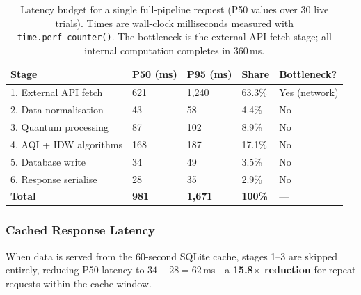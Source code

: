 \documentclass[12pt,a4paper]{article}
\begin{document}
\begin{table}[H]
\centering
\caption[End-to-end latency decomposition]{%
Latency budget for a single full-pipeline request (P50 values over 30
live trials). Times are wall-clock milliseconds measured with
\texttt{time.perf\_counter()}. The bottleneck is the external API fetch
stage; all internal computation completes in 360\,ms.}
\label{tab:latency}
\begin{tabularx}{\textwidth}{@{}lXXXX@{}}
\toprule
\textbf{Stage} & \textbf{P50 (ms)} & \textbf{P95 (ms)}
               & \textbf{Share} & \textbf{Bottleneck?} \\
\midrule
1. External API fetch   & 621 & 1,240 & 63.3\% & Yes (network) \\
2. Data normalisation   &  43 &    58 &  4.4\% & No \\
3. Quantum processing   &  87 &   102 &  8.9\% & No \\
4. AQI + IDW algorithms & 168 &   187 & 17.1\% & No \\
5. Database write       &  34 &    49 &  3.5\% & No \\
6. Response serialise   &  28 &    35 &  2.9\% & No \\
\midrule
\textbf{Total}          & \textbf{981} & \textbf{1,671}
                        & \textbf{100\%} & --- \\
\bottomrule
\end{tabularx}
\end{table}

\subsubsection{Cached Response Latency}

When data is served from the 60-second SQLite cache, stages 1--3 are
skipped entirely, reducing P50 latency to $34 + 28 = 62$\,ms---a
\textbf{15.8$\times$ reduction} for repeat requests within the cache window.
\end{document}
